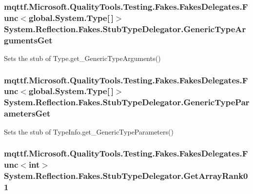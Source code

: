 \hypertarget{class_system_1_1_reflection_1_1_fakes_1_1_stub_type_delegator_aa72ee4f1371ea3b3bfa8b6a27cc5cdcc}{
\subsubsection[{Generic\-Type\-Arguments\-Get}]{\setlength{\rightskip}{0pt plus 5cm}mqttf.\-Microsoft.\-Quality\-Tools.\-Testing.\-Fakes.\-Fakes\-Delegates.\-Func$<$global.\-System.\-Type\mbox{[}$\,$\mbox{]}$>$ System.\-Reflection.\-Fakes.\-Stub\-Type\-Delegator.\-Generic\-Type\-Arguments\-Get}}\label{class_system_1_1_reflection_1_1_fakes_1_1_stub_type_delegator_aa72ee4f1371ea3b3bfa8b6a27cc5cdcc}


Sets the stub of Type.\-get\-\_\-\-Generic\-Type\-Arguments()

\hypertarget{class_system_1_1_reflection_1_1_fakes_1_1_stub_type_delegator_abd7388d08ec00a0c6af1f439168324a6}{
\subsubsection[{Generic\-Type\-Parameters\-Get}]{\setlength{\rightskip}{0pt plus 5cm}mqttf.\-Microsoft.\-Quality\-Tools.\-Testing.\-Fakes.\-Fakes\-Delegates.\-Func$<$global.\-System.\-Type\mbox{[}$\,$\mbox{]}$>$ System.\-Reflection.\-Fakes.\-Stub\-Type\-Delegator.\-Generic\-Type\-Parameters\-Get}}\label{class_system_1_1_reflection_1_1_fakes_1_1_stub_type_delegator_abd7388d08ec00a0c6af1f439168324a6}


Sets the stub of Type\-Info.\-get\-\_\-\-Generic\-Type\-Parameters()

\hypertarget{class_system_1_1_reflection_1_1_fakes_1_1_stub_type_delegator_afc4eacf9ebf49f0f7b9ba3bb68c17ab2}{
\subsubsection[{Get\-Array\-Rank01}]{\setlength{\rightskip}{0pt plus 5cm}mqttf.\-Microsoft.\-Quality\-Tools.\-Testing.\-Fakes.\-Fakes\-Delegates.\-Func$<$int$>$ System.\-Reflection.\-Fakes.\-Stub\-Type\-Delegator.\-Get\-Array\-Rank01}}\label{class_system_1_1_reflection_1_1_fakes_1_1_stub_type_delegator_afc4eacf9ebf49f0f7b9ba3bb68c17ab2}


